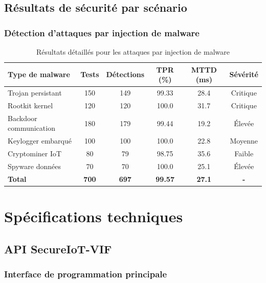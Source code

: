 \section{Résultats de sécurité par scénario}

\subsection{Détection d'attaques par injection de malware}

\begin{table}[h]
\centering
\caption{Résultats détaillés pour les attaques par injection de malware}
\label{tab:malware-detection-details}
\begin{tabular}{|l|c|c|c|c|c|}
\hline
\textbf{Type de malware} & \textbf{Tests} & \textbf{Détections} & \textbf{TPR (\%)} & \textbf{MTTD (ms)} & \textbf{Sévérité} \\
\hline
Trojan persistant & 150 & 149 & 99.33 & 28.4 & Critique \\
Rootkit kernel & 120 & 120 & 100.0 & 31.7 & Critique \\
Backdoor communication & 180 & 179 & 99.44 & 19.2 & Élevée \\
Keylogger embarqué & 100 & 100 & 100.0 & 22.8 & Moyenne \\
Cryptominer IoT & 80 & 79 & 98.75 & 35.6 & Faible \\
Spyware données & 70 & 70 & 100.0 & 25.1 & Élevée \\
\hline
\textbf{Total} & \textbf{700} & \textbf{697} & \textbf{99.57} & \textbf{27.1} & \textbf{-} \\
\hline
\end{tabular}
\end{table}

\chapter{Spécifications techniques}
\label{app:technical-specs}

\section{API SecureIoT-VIF}

\subsection{Interface de programmation principale}

